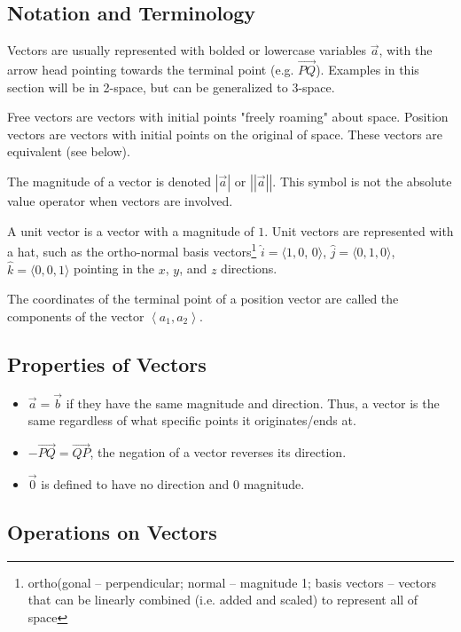 \documentclass{article}
\begin{document}
\subsection{Notation and Terminology}
Vectors are usually represented with bolded or lowercase variables $\Vec{a}$, with the arrow head pointing towards the terminal point (e.g. $\overrightarrow{PQ}$). Examples in this section will be in 2-space, but can be generalized to 3-space.

Free vectors are vectors with initial points "freely roaming" about space. Position vectors are vectors with initial points on the original of space. These vectors are equivalent (see below).

The magnitude of a vector is denoted $\left|\Vec{a}\right|$ or $\left|\left|\Vec{a}\right|\right|$. This symbol is not the absolute value operator when vectors are involved.

A unit vector is a vector with a magnitude of $1$. Unit vectors are represented with a hat, such as the ortho-normal basis vectors\footnote{ortho(gonal -- perpendicular; normal -- magnitude 1; basis vectors -- vectors that can be linearly combined (i.e. added and scaled) to represent all of space} $\hat{i} = \langle1, 0$, $0\rangle$, $\hat{j} = \langle 0, 1, 0 \rangle$, $\hat{k} = \langle 0, 0, 1 \rangle$ pointing in the $x$, $y$, and $z$ directions.

The coordinates of the terminal point of a position vector are called the components of the vector $\left\langle a_1, a_2 \right\rangle$.

\subsection{Properties of Vectors}
\begin{itemize}
    \item $\Vec{a}=\Vec{b}$ if they have the same magnitude and direction. Thus, a vector is the same regardless of what specific points it originates/ends at.
    \item $-\overrightarrow{PQ} = \overrightarrow{QP}$, the negation of a vector reverses its direction.
    \item $\overrightarrow{0}$ is defined to have no direction and $0$ magnitude.
\end{itemize}

\subsection{Operations on Vectors}
\end{document}
